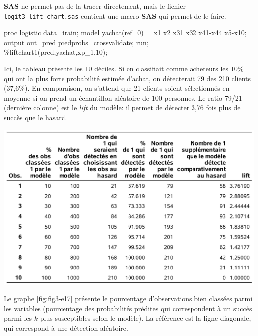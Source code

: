\documentclass[
  11pt,
  letterpaper,
]{book}
\newenvironment{Shaded}{\begin{snugshade}}{\end{snugshade}}
\newcommand{\NormalTok}[1]{#1}
\theoremstyle{definition}
\theoremstyle{definition}
\theoremstyle{definition}
\theoremstyle{definition}
\theoremstyle{remark}
\begin{document}
\textbf{SAS} ne permet pas de la tracer directement, mais le fichier \texttt{logit3\_lift\_chart.sas} contient une macro \textbf{SAS} qui permet de le faire.

\begin{Shaded}
\begin{Highlighting}[]
\NormalTok{proc logistic data=train;}
\NormalTok{model yachat(ref=\textquotesingle{}0\textquotesingle{}) = x1 x2 x31 x32 x41{-}x44 x5{-}x10;}
\NormalTok{output out=pred predprobs=crossvalidate;}
\NormalTok{run;}
\NormalTok{\%liftchart1(pred,yachat,xp\_1,10);}
\end{Highlighting}
\end{Shaded}

Ici, le tableau présente les 10 déciles. Si on classifiait comme acheteurs les 10\% qui ont la plus forte probabilité estimée d'achat, on détecterait 79 des 210 clients (37,6\%). En comparaison, on s'attend que 21 clients soient sélectionnés en moyenne si on prend un échantillon aléatoire de 100 personnes. Le ratio 79/21 (dernière colonne) est le \emph{lift} du modèle: il permet de détecter 3,76 fois plus de succès que le hasard.

\begin{center}\includegraphics[width=0.8\linewidth]{figures/03-logistic-e16} \end{center}

Le graphe \ref{fig:fig3-e17} présente le pourcentage d'observations bien classées parmi les variables (pourcentage des probabilités prédites qui correspondent à un succès parmi les \(k\) plus susceptibles selon le modèle). La référence est la ligne diagonale, qui correspond à une détection aléatoire.
\end{document}

